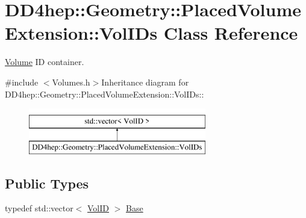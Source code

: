 \hypertarget{class_d_d4hep_1_1_geometry_1_1_placed_volume_extension_1_1_vol_i_ds}{
\section{DD4hep::Geometry::PlacedVolumeExtension::VolIDs Class Reference}
\label{class_d_d4hep_1_1_geometry_1_1_placed_volume_extension_1_1_vol_i_ds}
}


\hyperlink{class_d_d4hep_1_1_geometry_1_1_volume}{Volume} ID container.  


{\ttfamily \#include $<$Volumes.h$>$}Inheritance diagram for DD4hep::Geometry::PlacedVolumeExtension::VolIDs::\begin{figure}[H]
\begin{center}
\leavevmode
\includegraphics[height=2cm]{class_d_d4hep_1_1_geometry_1_1_placed_volume_extension_1_1_vol_i_ds}
\end{center}
\end{figure}
\subsection*{Public Types}
\begin{DoxyCompactItemize}
\item 
typedef std::vector$<$ \hyperlink{class_d_d4hep_1_1_geometry_1_1_placed_volume_extension_a9f0e95dedfbda206b118af985b2ed473}{VolID} $>$ \hyperlink{class_d_d4hep_1_1_geometry_1_1_placed_volume_extension_1_1_vol_i_ds_a9328d0964ef092fd108679b2ecafd5b7}{Base}
\end{DoxyCompactItemize}
